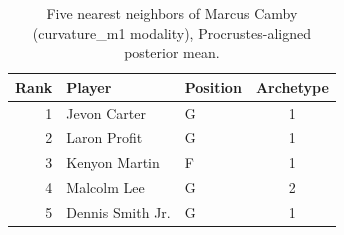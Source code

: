 \begin{table}[htbp]
  \centering\small
  \begin{tabular}{rllc}
    \toprule
    Rank & Player & Position & Archetype \\
    \midrule
    1 & Jevon Carter & G & 1 \\
    2 & Laron Profit & G & 1 \\
    3 & Kenyon Martin & F & 1 \\
    4 & Malcolm Lee & G & 2 \\
    5 & Dennis Smith Jr. & G & 1 \\
    \bottomrule
  \end{tabular}
  \caption{Five nearest neighbors of Marcus Camby (curvature_m1 modality), Procrustes-aligned posterior mean.}
  \label{tab:Marcus_Camby_neighbors_curvature_m1}
\end{table}

